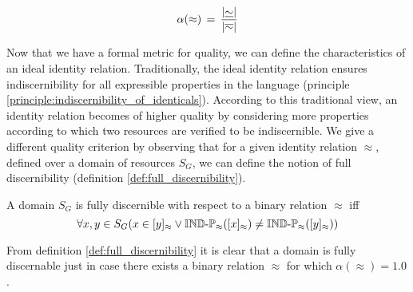 \begin{definition}[Quality]
\label{def:quality}
\begin{align}
  \alpha(\approx)
\, = \,
  \dfrac{
    \lvert\underline{\sim}\rvert
  }{
    \lvert\overline{\sim}\rvert
  }\nonumber
\end{align}
\end{definition}

\noindent Now that we have a formal metric for quality,
  we can define the characteristics of an ideal identity relation.
Traditionally, the ideal identity relation ensures indiscernibility
  for all expressible properties in the language
  (principle \ref{principle:indiscernibility_of_identicals}).
According to this traditional view, an identity relation becomes of
  higher quality by considering more properties
  according to which two resources are verified to be indiscernible.
We give a different quality criterion by observing that
  for a given identity relation $\approx$,
  defined over a domain of resources $S_G$,
  we can define the notion of full discernibility
  (definition \ref{def:full_discernibility}).

\begin{definition}
\label{def:full_discernibility}
A domain $S_G$ is fully discernible with respect to
  a binary relation $\approx$ iff
\[
  \forall x,y \in S_G (
      x \in [y]_{\approx}
    \lor
      \operatorname{{\mathbb{IND}-\mathbb{P}}}_{\approx}([x]_{\approx}) \neq \operatorname{{\mathbb{IND}-\mathbb{P}}}_{\approx}([y]_{\approx})
    )
\]
\end{definition}

\noindent From definition \ref{def:full_discernibility}
  it is clear that a domain is fully discernable just in case
  there exists a binary relation $\approx$
  for which \mbox{$\alpha(\approx) = 1.0$}.

\begin{comment}
\begin{definition}[Higher \& lower approximation]
\label{def:higher_lower_approximation}
\begin{align}
  y \in [x]_H
\,\iff\,\\
  \exists u (
      \card{[u]_{\sim}}>1
    \,\land\,
      \mathbb{P}([u]_{\sim})=\mathbb{P}(\set{x,y})
  )\nonumber
\\
  y \in [x]_L
\,\iff\,
  \forall S \subseteq D (\\
      (\card{S}>1 \,\land\, \mathbb{P}(S) = \mathbb{P}(\set{x,y}))
    \,\rightarrow\,
      \exists s \in D (S=[s]_{\sim})
  )\nonumber
\end{align}
\end{definition}
\end{comment}
